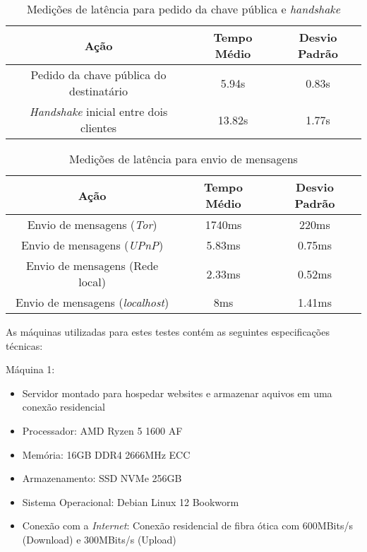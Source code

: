 \begin{table}[H]
\centering
\begin{tabular}{|c|c|c|}
\hline
\textbf{Ação} & \textbf{Tempo Médio} & \textbf{Desvio Padrão} \\ \hline
Pedido da chave pública do destinatário & 5.94s & 0.83s \\ \hline
\textit{Handshake} inicial entre dois clientes & 13.82s & 1.77s \\ \hline
\end{tabular}
\caption{Medições de latência para pedido da chave pública e \textit{handshake}}
\label{tab:latencia_handshake}
\end{table}

\begin{table}[H]
\centering
\begin{tabular}{|c|c|c|}
\hline
\textbf{Ação} & \textbf{Tempo Médio} & \textbf{Desvio Padrão} \\ \hline
Envio de mensagens (\textit{Tor}) & 1740ms & 220ms \\ \hline
Envio de mensagens (\textit{UPnP}) & 5.83ms & 0.75ms \\ \hline
Envio de mensagens (Rede local) & 2.33ms & 0.52ms \\ \hline
Envio de mensagens (\textit{localhost}) & 8ms & 1.41ms \\ \hline
\end{tabular}
\caption{Medições de latência para envio de mensagens}
\label{tab:latencia_mensagens}
\end{table}

As máquinas utilizadas para estes testes contém as seguintes especificações técnicas:

Máquina 1:

\begin{tcolorbox}[colback=gray!10, colframe=gray, sharp corners=south]
\begin{itemize}
    \setlength\itemsep{0em}
    \setlength\leftmargini{2em}
    \item Servidor montado para hospedar websites e armazenar aquivos em uma conexão residencial
    \item Processador: AMD Ryzen 5 1600 AF
    \item Memória: 16GB DDR4 2666MHz ECC
    \item Armazenamento: SSD NVMe 256GB
    \item Sistema Operacional: Debian Linux 12 Bookworm
    \item Conexão com a \textit{Internet}: Conexão residencial de fibra ótica com 600MBits/s (Download) e 300MBits/s (Upload)
\end{itemize}
\end{tcolorbox}

